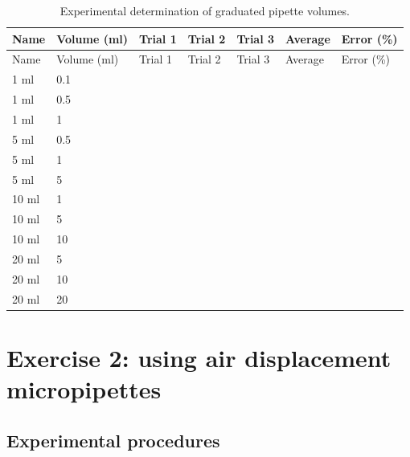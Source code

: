 \documentclass[]{book}
\begin{document}
\begin{longtable}[]{@{}lllllll@{}}
\caption{\label{tab:graduated} Experimental determination of graduated
pipette volumes.}\tabularnewline
\toprule
Name & Volume (ml) & Trial 1 & Trial 2 & Trial 3 & Average & Error
(\%)\tabularnewline
\midrule
\endfirsthead
\toprule
Name & Volume (ml) & Trial 1 & Trial 2 & Trial 3 & Average & Error
(\%)\tabularnewline
\midrule
\endhead
1 ml & 0.1 & & & & &\tabularnewline
1 ml & 0.5 & & & & &\tabularnewline
1 ml & 1 & & & & &\tabularnewline
5 ml & 0.5 & & & & &\tabularnewline
5 ml & 1 & & & & &\tabularnewline
5 ml & 5 & & & & &\tabularnewline
10 ml & 1 & & & & &\tabularnewline
10 ml & 5 & & & & &\tabularnewline
10 ml & 10 & & & & &\tabularnewline
20 ml & 5 & & & & &\tabularnewline
20 ml & 10 & & & & &\tabularnewline
20 ml & 20 & & & & &\tabularnewline
\bottomrule
\end{longtable}

\section{Exercise 2: using air displacement
micropipettes}\label{exercise-2-using-air-displacement-micropipettes}

\subsection{Experimental procedures}\label{experimental-procedures-6}
\end{document}

